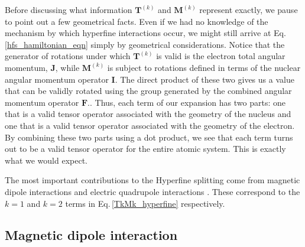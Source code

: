 Before discussing what information $\mathbf{T}^{(k)}$ and $\mathbf{M}^{(k)}$ represent exactly,
we pause to point out a few geometrical facts. Even if we had no knowledge of the mechanism by which hyperfine interactions occur, we might still arrive at Eq.\,\ref{hfs_hamiltonian_eqn} simply by geometrical considerations.
Notice that the generator of rotations under which $\mathbf{T}^{(k)}$ is valid is the electron total angular momentum, $\mathbf{J}$, while $\mathbf{M}^{(k)}$ is subject to rotations defined in terms of the nuclear angular momentum operator $\mathbf{I}$. 
The direct product of these two gives us a value that can be validly rotated using the group generated by the combined angular momentum operator $\mathbf{F}$.\cite{Racah2}\cite{sobelman_spectra}. Thus, each term of our expansion has two parts: one that is a valid tensor operator associated with the geometry of the nucleus and one that is a valid tensor operator associated with the geometry of the electron. By combining these two parts using a dot product, we see that each term turns out to be a valid tensor operator for the entire atomic system. This is exactly what we would expect.

The most important contributions to the Hyperfine splitting come from magnetic dipole interactions and electric quadrupole interactions \cite{sobelman_spectra}\cite{schwartz_hyperfine_expansion}\cite{cuaMITnotes}. These correspond to the $k=1$ and $k=2$ terms in Eq.\,\ref{TkMk_hyperfine} respectively\cite{experimental_hyperfine_alkali_arimondo}.
\subsection{Magnetic dipole interaction}

